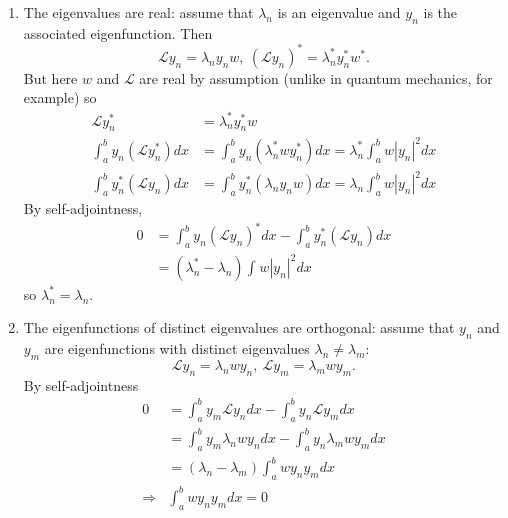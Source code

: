 \documentclass[a4paper]{article}
\renewcommand*\L{\mathcal{L}}
\begin{document}
\begin{enumerate}
\item The eigenvalues are real: assume that \(\lambda_n\) is an eigenvalue and \(y_n\) is the associated eigenfunction. Then
  \[
\L y_n = \lambda_ny_n w, \: (\L y_n)^* = \lambda_n^*y_n^*w^*.
  \]
  But here \(w\) and \(\L\) are real by assumption (unlike in quantum mechanics, for example) so
  \begin{align*}
    \L y_n^* &= \lambda_n^* y_n^* w \\
    \int_{a}^{b} y_n(\L y_n^*) dx &=  \int_{a}^{b} y_n(\lambda_n^*wy_n^*) dx = \lambda_n^* \int_{a}^{b} w |y_n|^2 dx \\
    \int_{a}^{b} y_n^* (\L y_n) dx &= \int_{a}^{b} y_n^*(\lambda_ny_nw) dx = \lambda_n \int_{a}^{b} w |y_n|^2 dx
  \end{align*}
  By self-adjointness,
  \begin{align*}
    0 &= \int_{a}^{b} y_n (\L y_n)^* dx - \int_{a}^{b} y_n^* (\L y_n) dx \\
      &= (\lambda_n^* - \lambda_n) \int_{ }^{ } w |y_n|^2 dx
  \end{align*}
  so \(\lambda_n^* = \lambda_n\).
\item The eigenfunctions of distinct eigenvalues are orthogonal: assume that \(y_n\) and \(y_m\) are eigenfunctions with distinct eigenvalues \(\lambda_n \neq \lambda_m\):
  \[
\L y_n = \lambda_n w y_n, \: \L y_m = \lambda_m wy_m.
\]
By self-adjointness
\begin{align*}
  0 &= \int_{a}^{b} y_m\L y_n dx - \int_{a}^{b} y_n\L y_m dx \\
    &= \int_{a}^{b} y_m \lambda_nwy_n dx - \int_{a}^{b} y_n\lambda_mwy_m dx \\
    &= (\lambda_n - \lambda_m) \int_{a}^{b} wy_ny_m dx \\
  \Rightarrow &\int_{a}^{b} wy_ny_m dx = 0
\end{align*}


\end{enumerate}
\end{document}

